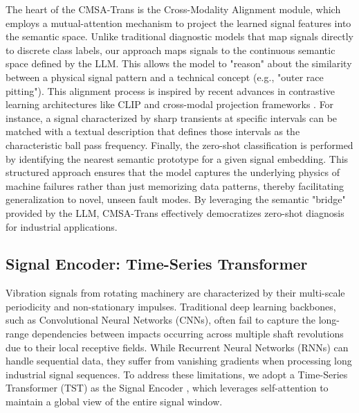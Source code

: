 \documentclass[journal]{IEEEtran}
\begin{document}
The heart of the CMSA-Trans is the Cross-Modality Alignment module, which employs a mutual-attention mechanism to project the learned signal features into the semantic space. Unlike traditional diagnostic models that map signals directly to discrete class labels, our approach maps signals to the continuous semantic space defined by the LLM. This allows the model to "reason" about the similarity between a physical signal pattern and a technical concept (e.g., "outer race pitting"). This alignment process is inspired by recent advances in contrastive learning architectures like CLIP \cite{radford2021learning} and cross-modal projection frameworks \cite{oord2018representation, chen2020simple}. For instance, a signal characterized by sharp transients at specific intervals can be matched with a textual description that defines those intervals as the characteristic ball pass frequency. Finally, the zero-shot classification is performed by identifying the nearest semantic prototype for a given signal embedding. This structured approach ensures that the model captures the underlying physics of machine failures rather than just memorizing data patterns, thereby facilitating generalization to novel, unseen fault modes. By leveraging the semantic "bridge" provided by the LLM, CMSA-Trans effectively democratizes zero-shot diagnosis for industrial applications.

\subsection{Signal Encoder: Time-Series Transformer}
Vibration signals from rotating machinery are characterized by their multi-scale periodicity and non-stationary impulses. Traditional deep learning backbones, such as Convolutional Neural Networks (CNNs), often fail to capture the long-range dependencies between impacts occurring across multiple shaft revolutions due to their local receptive fields. While Recurrent Neural Networks (RNNs) can handle sequential data, they suffer from vanishing gradients when processing long industrial signal sequences. To address these limitations, we adopt a Time-Series Transformer (TST) as the Signal Encoder \cite{zerveas2021transformer}, which leverages self-attention to maintain a global view of the entire signal window.
\end{document}
